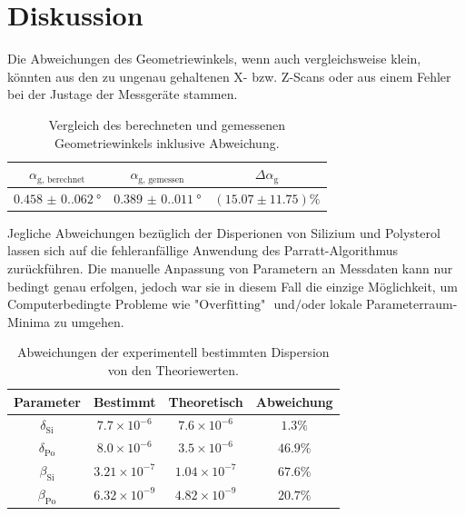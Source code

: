 \documentclass[12pt]{article}
\begin{document}
\section{Diskussion}\label{sec:diskussion}
Die Abweichungen des Geometriewinkels, wenn auch vergleichsweise klein, könnten aus den zu ungenau gehaltenen X- bzw. Z-Scans oder aus einem Fehler bei der Justage der Messgeräte stammen.
\begin{table}[H]
  \centering
  \renewcommand{\arraystretch}{1.5} %
  \caption{Vergleich des berechneten und gemessenen Geometriewinkels inklusive Abweichung.}
  \begin{tabular}{c|c|c}
    \hline
    $\alpha_\text{g, berechnet}$ & $\alpha_\text{g, gemessen}$ & $\Delta\alpha_\text{g}$ \\
    \hline
    $\SI{0.458(0.062)}{\degree}$ & $\SI{0.389(0.011)}{\degree}$ &  $(\num{15.07} \pm \num{11.75})\%$ \\
  \end{tabular}
  \label{tab:geometriewinkel}
\end{table}
Jegliche Abweichungen bezüglich der Disperionen von Silizium und Polysterol lassen sich auf die fehleranfällige Anwendung des Parratt-Algorithmus zurückführen.
Die manuelle Anpassung von Parametern an Messdaten kann nur bedingt genau erfolgen, jedoch war sie in diesem Fall die einzige Möglichkeit, um Computerbedingte Probleme wie "$\text{Overfitting}$" $\text{ und/oder}$ lokale Parameterraum-Minima zu umgehen.
\begin{table}[H]
  \centering
  \renewcommand{\arraystretch}{1.5} %
  \begin{tabular}{c|c|c|c}
    \hline
    Parameter & Bestimmt & Theoretisch & Abweichung \\
    \hline
    $\delta_\text{Si}$ &  $\num{7.7} \times 10^{-6}$ &    $\num{7.6}\times 10^{-6}$  &     $\num{1.3}\%$ \\
    $\delta_\text{Po}$ &  $\num{8.0} \times 10^{-6}$ &    $\num{3.5}\times 10^{-6}$  &     $\num{46.9}\%$ \\
    $\beta_\text{Si}$ &   $\num{3.21}  \times 10^{-7}$ &  $\num{1.04}\times 10^{-7}$ &   $\num{67.6}\%$ \\
    $\beta_\text{Po}$ &   $\num{6.32}  \times 10^{-9}$ &  $\num{4.82}\times 10^{-9}$ &   $\num{20.7}\%$ \\
    \hline
  \end{tabular}
  \caption{Abweichungen der experimentell bestimmten Dispersion von den Theoriewerten.}
  \label{tab:parameter}
\end{table}
\end{document}
